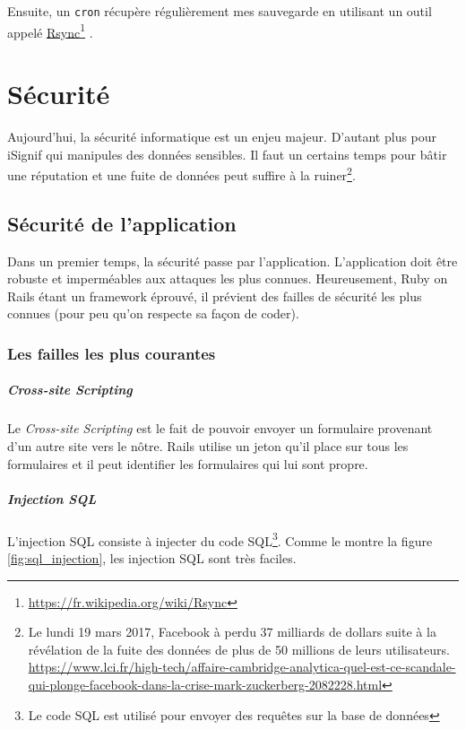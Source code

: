 \documentclass[]{report}
\newcommand\fnurl[2]{%
  \href{#1}{#2}\footnote{\url{#1}}%
}
\begin{document}
     Ensuite, un \verb|cron| récupère régulièrement mes sauvegarde en utilisant un outil appelé \fnurl{https://fr.wikipedia.org/wiki/Rsync}{Rsync}.

\chapter{Sécurité}

  Aujourd'hui, la sécurité informatique est un enjeu majeur. D'autant plus pour iSignif qui manipules des données sensibles. Il faut un certains temps pour bâtir une réputation et une fuite de données peut suffire à la ruiner\footnote{Le lundi 19 mars 2017, Facebook à perdu 37 milliards de dollars suite à la révélation de la fuite des données de plus de 50 millions de leurs utilisateurs.  \url{https://www.lci.fr/high-tech/affaire-cambridge-analytica-quel-est-ce-scandale-qui-plonge-facebook-dans-la-crise-mark-zuckerberg-2082228.html}}.

  \section{Sécurité de l'application}

    Dans un premier temps, la sécurité passe par l'application. L'application doit être robuste et imperméables aux attaques les plus connues. Heureusement, Ruby on Rails étant un framework éprouvé, il prévient des failles de sécurité les plus connues (pour peu qu'on respecte sa façon de coder).

    \subsection{Les failles les plus courantes}


      \paragraph{\textit{Cross-site Scripting}}

        Le \textit{Cross-site Scripting} est le fait de pouvoir envoyer un formulaire provenant d'un autre site vers le nôtre. Rails utilise un jeton qu'il place sur tous les formulaires et il peut identifier les formulaires qui lui sont propre.

      \paragraph{Injection SQL}

        L'injection SQL consiste à injecter du code SQL\footnote{Le code SQL est utilisé pour envoyer des requêtes sur la base de données}. Comme le montre la figure \ref{fig:sql_injection}, les injection SQL sont très faciles.
\end{document}
